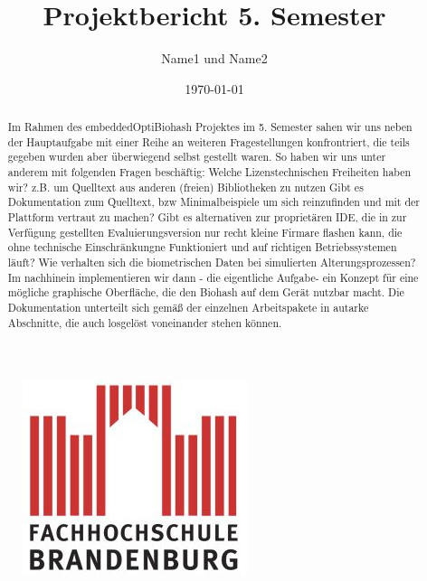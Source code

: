 \documentclass[a4paper,12pt]{scrartcl}
\title{Projektbericht 5. Semester}
\author{Name1 und Name2}
\date{\today}
\begin{document}
\linespread{1.5}
\maketitle 

\begin{abstract} 
\noindent
Im Rahmen des embeddedOptiBiohash Projektes im 5. Semester sahen wir uns neben der Hauptaufgabe mit einer Reihe an weiteren Fragestellungen konfrontriert, die teils gegeben wurden aber \"uberwiegend selbst gestellt waren.
So haben wir uns unter anderem mit folgenden Fragen besch\"aftig:
\newline\noindent
Welche Lizenstechnischen Freiheiten haben wir? z.B. um Quelltext aus anderen (freien) Bibliotheken zu nutzen
\newline\noindent
Gibt es Dokumentation zum Quelltext, bzw Minimalbeispiele um sich reinzufinden und mit der Plattform vertraut zu machen?
\newline\noindent	
Gibt es alternativen zur propriet\"aren IDE, die in zur Verf\"ugung gestellten Evaluierungsversion nur recht kleine Firmare flashen kann, die ohne technische Einschr\"ankungne Funktioniert und auf richtigen Betriebssystemen l\"auft?
\newline\noindent	
Wie verhalten sich die biometrischen Daten bei simulierten Alterungsprozessen?
\newline\noindent	
Im nachhinein implementieren wir dann - die eigentliche Aufgabe- ein Konzept f\"ur eine m\"ogliche graphische Oberfl\"ache, die den Biohash auf dem Ger\"at nutzbar macht.
Die Dokumentation unterteilt sich gem\"a{\ss} der einzelnen Arbeitspakete in autarke Abschnitte, die auch losgel\"ost voneinander stehen k\"onnen.
\end{abstract}

\begin{figure}
  	\centering
    	\includegraphics[scale=0.25]{img/fhlogo.jpg}
\end{figure}


\newpage
\tableofcontents
\newpage

\newpage

\newpage


\newpage

%
%
\newpage
%
\end{document}
